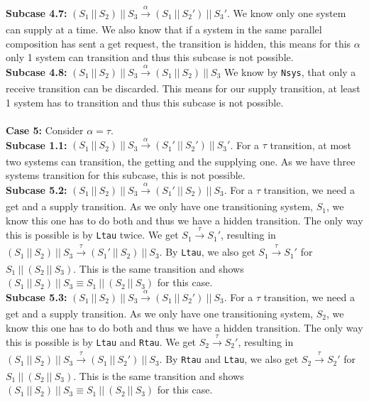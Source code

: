 \indent \textbf{Subcase 4.7: }$(S_1 \ || \ S_2)\ ||\ S_3 \xrightarrow[]{\alpha} (S_1 \ || \ S_2')\ ||\ S_3'$. We know only one system can supply at a time. We also know that if a system in the same parallel composition has sent a get request, the transition is hidden, this means for this $\alpha$ only 1 system can transition and thus this subcase is not possible.\\
\indent \textbf{Subcase 4.8: }$(S_1 \ || \ S_2)\ ||\ S_3 \xrightarrow[]{\alpha} (S_1 \ || \ S_2)\ ||\ S_3$ We know by \texttt{Nsys}, that only a receive transition can be discarded. This means for our supply transition, at least 1 system has to transition and thus this subcase is not possible.\\
\\
\textbf{Case 5: } Consider $\alpha = \tau$.\\
\indent \textbf{Subcase 1.1: }$(S_1 \ || \ S_2)\ ||\ S_3 \xrightarrow[]{\alpha} (S_1' \ || \ S_2')\ ||\ S_3'$. For a $\tau$ transition, at most two systems can transition, the getting and the supplying one. As we have three systems transition for this subcase, this is not possible.\\
\indent \textbf{Subcase 5.2: }$(S_1 \ || \ S_2)\ ||\ S_3 \xrightarrow[]{\alpha} (S_1' \ || \ S_2)\ ||\ S_3$. For a $\tau$ transition, we need a get and a supply transition. As we only have one transitioning system, $S_1$, we know this one has to do both and thus we have a hidden transition. The only way this is possible is by \texttt{Ltau} twice. We get $S_1\xrightarrow[]{\tau} S_1'$, resulting in $(S_1 \ || \ S_2)\ ||\ S_3 \xrightarrow[]{\tau} (S_1' \ || \ S_2)\ ||\ S_3$. By \texttt{Ltau}, we also get $S_1\xrightarrow[]{\tau} S_1'$ for $S_1 \ ||\ (S_2 \ || \ S_3)$. This is the same transition and shows $(S_1 \ ||\ S_2 )\ || \ S_3 \equiv S_1 \ ||\ (S_2 \ || \ S_3)$ for this case.\\
\indent \textbf{Subcase 5.3: }$(S_1 \ || \ S_2)\ ||\ S_3 \xrightarrow[]{\alpha} (S_1 \ || \ S_2')\ ||\ S_3$. For a $\tau$ transition, we need a get and a supply transition. As we only have one transitioning system, $S_2$, we know this one has to do both and thus we have a hidden transition. The only way this is possible is by \texttt{Ltau} and \texttt{Rtau}. We get $S_2\xrightarrow[]{\tau} S_2'$, resulting in $(S_1 \ || \ S_2)\ ||\ S_3 \xrightarrow[]{\tau} (S_1 \ || \ S_2')\ ||\ S_3$. By \texttt{Rtau} and \texttt{Ltau}, we also get $S_2\xrightarrow[]{\tau} S_2'$ for $S_1 \ ||\ (S_2 \ || \ S_3)$. This is the same transition and shows $(S_1 \ ||\ S_2 )\ || \ S_3 \equiv S_1 \ ||\ (S_2 \ || \ S_3)$ for this case.\\
